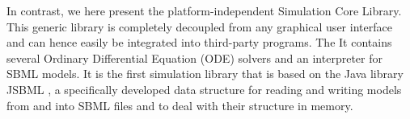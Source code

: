 \documentclass{bioinfo}
\begin{document}
In contrast, we here present the platform-independent Simulation Core
Library. This generic library is completely decoupled from any graphical user
interface and can hence easily be integrated into third-party programs. The
It contains several Ordinary Differential Equation (ODE)
solvers and an interpreter for SBML models. It is the first simulation library
that is based on the Java library JSBML \citep{Draeger2011b}, a specifically
developed data structure for reading and writing models from and into SBML
files and to deal with their structure in memory.

\end{document}
